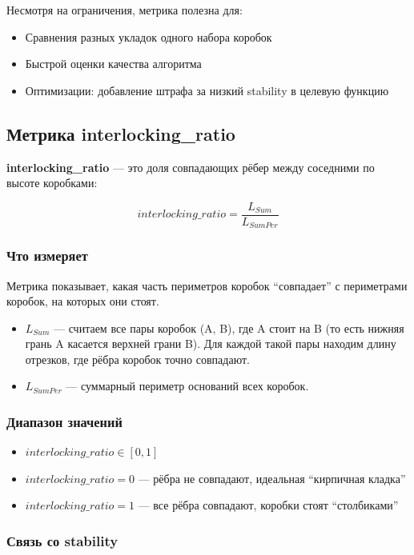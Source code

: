 Несмотря на ограничения, метрика полезна для:
\begin{itemize}
    \item Сравнения разных укладок одного набора коробок
    \item Быстрой оценки качества алгоритма
    \item Оптимизации: добавление штрафа за низкий stability в целевую функцию
\end{itemize}

\subsection{Метрика interlocking\_ratio}

\textbf{interlocking\_ratio} --- это доля совпадающих рёбер между соседними по высоте коробками:

$$interlocking\_ratio = \frac{L_{Sum}}{L_{SumPer}}$$

\subsubsection{Что измеряет}

Метрика показывает, какая часть периметров коробок ``совпадает'' с периметрами коробок, на которых они стоят.

\begin{itemize}
    \item $L_{Sum}$ --- считаем все пары коробок (A, B), где A стоит на B (то есть нижняя грань A касается верхней грани B). Для каждой такой пары находим длину отрезков, где рёбра коробок точно совпадают.
    \item $L_{SumPer}$ --- суммарный периметр оснований всех коробок.
\end{itemize}

\subsubsection{Диапазон значений}

\begin{itemize}
    \item $interlocking\_ratio \in [0, 1]$
    \item $interlocking\_ratio = 0$ --- рёбра не совпадают, идеальная ``кирпичная кладка''
    \item $interlocking\_ratio = 1$ --- все рёбра совпадают, коробки стоят ``столбиками''
\end{itemize}

\subsubsection{Связь со stability}

